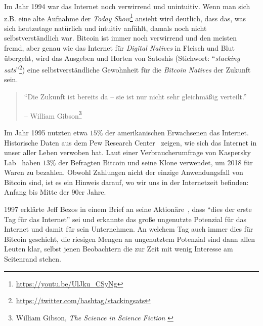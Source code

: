 Im Jahr 1994 war das Internet noch verwirrend und unintuitiv. Wenn man sich z.B.
eine alte Aufnahme der \textit{Today
Show}\footnote{\url{https://youtu.be/UlJku_CSyNg}} ansieht wird deutlich, dass
das, was sich heutzutage natürlich und intuitiv anfühlt, damals noch nicht
selbstverständlich war. Bitcoin ist immer noch verwirrend und den meisten fremd,
aber genau wie das Internet für \textit{Digital Natives} in Fleisch und Blut
übergeht, wird das Ausgeben und Horten von Satoshis (Stichwort:
\enquote{\textit{stacking
sats}}\footnote{\url{https://twitter.com/hashtag/stackingsats}}) eine
selbstverständliche Gewohnheit für die \textit{Bitcoin Natives} der Zukunft sein.

\begin{quotation}\begin{samepage}
\enquote{Die Zukunft ist bereits da -- sie ist nur nicht sehr gleichmäßig
verteilt.} \begin{flushright} -- William Gibson\footnote{William Gibson,
\textit{The Science in Science Fiction} \cite{william-gibson}}
\end{flushright}\end{samepage}\end{quotation}

Im Jahr 1995 nutzten etwa $15\%$ der amerikanischen Erwachsenen das Internet.
Historische Daten aus dem Pew Research Center~\cite{pew-research} zeigen, wie
sich das Internet in unser aller Leben verwoben hat. Laut einer
Verbraucherumfrage von Kaspersky Lab~\cite{web:kaspersky} haben $13\%$ der
Befragten Bitcoin und seine Klone verwendet, um 2018 für Waren zu bezahlen.
Obwohl Zahlungen nicht der einzige Anwendungsfall von Bitcoin sind, ist es ein
Hinweis darauf, wo wir uns in der Internetzeit befinden: Anfang bis Mitte der
90er Jahre.

1997 erklärte Jeff Bezos in einem Brief an seine Aktionäre~\cite{bezos-letter},
dass \enquote{dies der erste Tag für das Internet} sei und erkannte das große
ungenutzte Potenzial für das Internet und damit für sein Unternehmen. An welchem
Tag auch immer dies für Bitcoin geschieht, die riesigen Mengen an ungenutztem
Potenzial sind dann allen Leuten klar, selbst jenen Beobachtern die zur Zeit mit
wenig Interesse am Seitenrand stehen.

